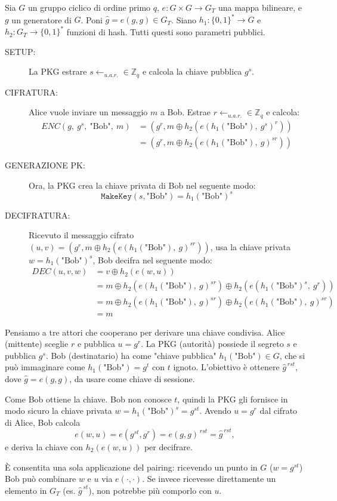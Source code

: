 \documentclass[a4paper, 11pt]{article}
\begin{document}
Sia $G$ un gruppo ciclico di ordine primo $q$, $e: G \times G \to G_T$ una mappa bilineare, e $g$ un generatore di $G$. Poni $\hat{g}=e(g,g)\in G_T$. Siano $h_1:\{0,1\}^\ast \to G$ e $h_2:G_T \to \{0,1\}^\ast$ funzioni di hash. Tutti questi sono parametri pubblici.

\begin{description}
    \item[SETUP:] La PKG estrare $s \gets_{u.a.r.} \in \mathbb{Z}_q$ e calcola la chiave pubblica $g^s$.
    \item[CIFRATURA:] Alice vuole inviare un messaggio $m$ a Bob. Estrae $r \gets_{u.a.r.} \in \mathbb{Z}_q$ e calcola:
    \begin{align*}
        ENC(g,\ g^s,\ \text{"Bob"},\ m) 
        &= \left( g^r, m \oplus h_2(e(h_1(\text{"Bob"}),\ g^s)^r) \right) \\
        &= \left( g^r, m \oplus h_2(e(h_1(\text{"Bob"}),\ g)^{sr}) \right)
    \end{align*}
    \item[GENERAZIONE PK:] Ora, la PKG crea la chiave privata di Bob nel seguente modo:
    \[
        \texttt{MakeKey}(s, \text{"Bob"}) = h_1(\text{"Bob"})^s
    \]
    \item[DECIFRATURA:] Ricevuto il messaggio cifrato $(u, v) = \left( g^r, m \oplus h_2(e(h_1(\text{"Bob"}),\ g)^{sr}) \right)$, usa la chiave privata $w = h_1(\text{"Bob"})^s$, Bob decifra nel seguente modo:
    \begin{align*}
        DEC(u, v, w) &= v \oplus h_2(e(w, u)) \\
        &= m \oplus h_2(e(h_1(\text{"Bob"}),\ g)^{sr}) \oplus h_2(e(h_1(\text{"Bob"})^s,\ g^r)) \\
        &= m \oplus h_2(e(h_1(\text{"Bob"}),\ g)^{sr}) \oplus h_2(e(h_1(\text{"Bob"}),\ g)^{sr}) \\
        &= m
    \end{align*}
\end{description}

Pensiamo a tre attori che cooperano per derivare una chiave condivisa.
Alice (mittente) sceglie $r$ e pubblica $u=g^{r}$.
La PKG (autorità) possiede il segreto $s$ e pubblica $g^{s}$.
Bob (destinatario) ha come "chiave pubblica" $h_1(\text{"Bob"})\in G$, che si può immaginare come $h_1(\text{"Bob"})=g^{t}$ con $t$ ignoto.
L'obiettivo è ottenere $\hat{g}^{\,rst}$, dove $\hat{g}=e(g,g)$, da usare come chiave di sessione.

Come Bob ottiene la chiave.
Bob non conosce $t$, quindi la PKG gli fornisce in modo sicuro la chiave privata
$w=h_1(\text{"Bob"})^{s}=g^{st}$.
Avendo $u=g^{r}$ dal cifrato di Alice, Bob calcola
\[
e(w,u)=e(g^{st},g^{r})=e(g,g)^{\,rst}=\hat{g}^{\,rst},
\]
e deriva la chiave con $h_2(e(w,u))$ per decifrare.

È consentita una sola applicazione del pairing: ricevendo un punto in $G$ ($w=g^{st}$) Bob può combinare $w$ e $u$ via $e(\cdot,\cdot)$.
Se invece ricevesse direttamente un elemento in $G_T$ (es. $\hat{g}^{\,st}$), non potrebbe più comporlo con $u$.
\end{document}
